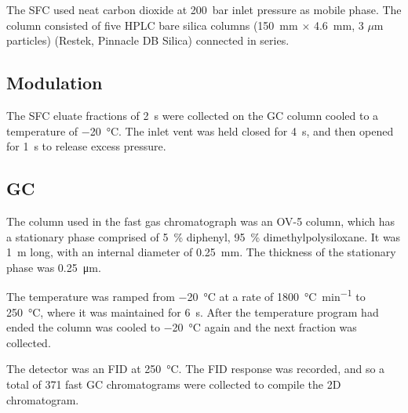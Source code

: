 The SFC used neat carbon dioxide at \SI{200}{\bar} inlet pressure as mobile
phase. The column consisted of five HPLC bare silica columns
(\SI{150}{\milli\metre} $\times$ \SI{4.6}{\milli\metre}, 3 $\mu$m particles)
(Restek, Pinnacle DB Silica) connected in series.

\subsection{Modulation}

The SFC eluate fractions of \SI{2}{\second} were collected on the GC column
cooled to a temperature of \SI{-20}{\celsius}. The inlet vent was held closed
for \SI{4}{\second}, and then opened for \SI{1}{\second} to release excess
pressure.

\subsection{GC}

The column used in the fast gas chromatograph was an OV-5 column, which has a
stationary phase comprised of \SI{5}{\percent} diphenyl, \SI{95}{\percent}
dimethylpolysiloxane. It was \SI{1}{\metre} long, with an internal diameter of
\SI{0.25}{\milli\metre}. The thickness of the stationary phase was
\SI{0.25}{\micro\metre}.

The temperature was ramped from \SI{-20}{\celsius} at a rate of
\SI{1800}{\celsius\per\minute} to \SI{250}{\celsius}, where it was maintained
for \SI{6}{s}. After the temperature program had ended the column was cooled to
\SI{-20}{\celsius} again and the next fraction was collected.

The detector was an FID at \SI{250}{\celsius}. The FID response was recorded,
and so a total of 371 fast GC chromatograms were collected to compile the 2D
chromatogram.


